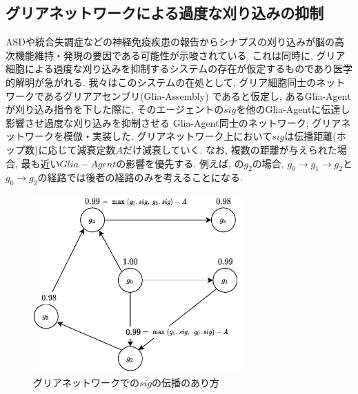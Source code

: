 \documentclass[a4paper, 9pt,twocolumn,dvipdfmx]{jsarticle}
\begin{document}
\subsection{グリアネットワークによる過度な刈り込みの抑制}
ASDや統合失調症などの神経免疫疾患の報告からシナプスの刈り込みが脳の高次機能維持・発現の要因である可能性が示唆されている.
これは同時に, グリア細胞による過度な刈り込みを抑制するシステムの存在が仮定するものであり医学的解明が急がれる.
我々はこのシステムの在処として, グリア細胞同士のネットワークであるグリアアセンブリ(Glia-Assembly)
であると仮定し, あるGlia-Agentが刈り込み指令を下した際に, 
そのエージェントの$sig$を他のGlia-Agentに伝達し影響させ過度な刈り込みを抑制させる
Glia-Agent同士のネットワーク; グリアネットワークを模倣・実装した.
グリアネットワーク上において$sig$は伝播距離(ホップ数)に応じて減衰定数$A$だけ減衰していく.
なお, 複数の距離が与えられた場合, 最も近い$Glia-Agent$の影響を優先する.
例えば, の$g_2$の場合, 
$g_0\rightarrow g_1\rightarrow g_2$と$g_0\rightarrow g_2$の経路では後者の経路のみを考えることになる.
\vspace{-5mm}
\begin{figure}[H]
  \centering
  \includegraphics[width=8cm]{GliaNetworks.pdf}
  \caption{グリアネットワークでの$sig$の伝播のあり方}
  \label{fig:GliaNetworks}
\end{figure}
\vspace{-4mm}
\end{document}
